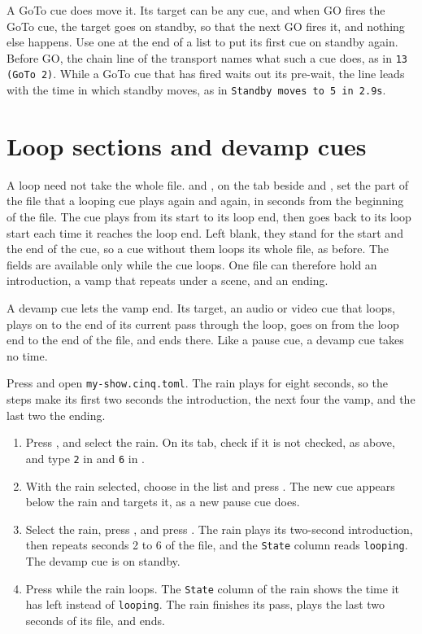 A GoTo cue does move it.  Its target can be any cue, and when GO fires the
GoTo cue, the target goes on standby, so that the next GO fires it, and
nothing else happens.  Use one at the end of a list to put its first cue on
standby again.  Before GO, the chain line of the transport names what such a cue
does, as in \texttt{13 (GoTo 2)}.  While a GoTo cue that has fired waits out its
pre-wait, the line leads with the time in which standby moves, as in
\texttt{Standby moves to 5 in 2.9s}.

\section{Loop sections and devamp cues}

A loop need not take the whole file.   and , on
the  tab beside  and , set the part of the
file that a looping cue plays again and again, in seconds from the beginning
of the file.  The cue plays from its start to its loop end, then goes back to
its loop start each time it reaches the loop end.  Left blank, they stand for
the start and the end of the cue, so a cue without them loops its whole file,
as before.  The fields are available only while the cue loops.  One file can
therefore hold an introduction, a vamp that repeats under a scene, and an
ending.

A devamp cue lets the vamp end.  Its target, an audio or video cue that
loops, plays on to the end of its current pass through the loop, goes on from
the loop end to the end of the file, and ends there.  Like a pause cue, a
devamp cue takes no time.

Press  and open \texttt{my-show.cinq.toml}.  The rain plays for
eight seconds, so the steps make its first two seconds the introduction, the
next four the vamp, and the last two the ending.

\begin{enumerate}
\item Press , and select the rain.  On its  tab,
  check  if it is not checked, as above,
  and type \texttt{2} in  and \texttt{6} in .
\item With the rain selected, choose  in the  list
  and press \@.  The new cue appears below the rain and targets
  it, as a new pause cue does.
\item Select the rain, press , and press \@.  The
  rain plays its two-second introduction, then repeats seconds 2 to 6 of the
  file, and the \texttt{State} column reads \texttt{looping}.  The devamp cue
  is on standby.
\item Press  while the rain loops.  The \texttt{State} column of the
  rain shows the time it has left instead of \texttt{looping}.  The rain
  finishes its pass, plays the last two seconds of its file, and ends.
\end{enumerate}

